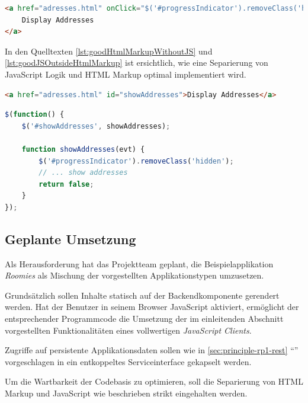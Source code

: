 \begin{lstlisting}[language=HTML, caption={Beispiel einer Vermischung von HTML Markup und JavaScript}, label={lst:badHtmlMarkupWithJavaScript}]
<a href="adresses.html" onClick="$('#progressIndicator').removeClass('hidden');showAddresses();return false;">
	Display Addresses
</a>
\end{lstlisting}

In den Quelltexten \ref{lst:goodHtmlMarkupWithoutJS} und \ref{lst:goodJSOutsideHtmlMarkup} ist ersichtlich, wie eine Separierung von JavaScript Logik und HTML Markup optimal implementiert wird.

\begin{lstlisting}[language=HTML, caption={Beispiel eines sauberen HTML Markups ohne JavaScript}, label={lst:goodHtmlMarkupWithoutJS}]
<a href="adresses.html" id="showAddresses">Display Addresses</a>
\end{lstlisting}

\begin{lstlisting}[language=JavaScript, caption={Beispiel Event-Handler in ausgelagerter JavaScript Datei}, label={lst:goodJSOutsideHtmlMarkup}]
$(function() {
	$('#showAddresses', showAddresses);

	function showAddresses(evt) {
		$('#progressIndicator').removeClass('hidden');
		// ... show addresses
		return false;
	}
});
\end{lstlisting}


\subsection*{Geplante Umsetzung}

Als Herausforderung hat das Projektteam geplant, die Beispielapplikation \emph{Roomies} als Mischung der vorgestellten Applikationstypen umzusetzen.

Grundsätzlich sollen Inhalte statisch auf der Backendkomponente gerendert werden. Hat der Benutzer in seinem Browser JavaScript aktiviert, ermöglicht der entsprechender Programmcode die Umsetzung der im einleitenden Abschnitt vorgestellten Funktionalitäten eines vollwertigen \emph{JavaScript Clients}.

Zugriffe auf persistente Applikationsdaten sollen wie in \ref{sec:principle-rp1-rest} ``'' vorgeschlagen in ein entkoppeltes Serviceinterface gekapselt werden.

Um die Wartbarkeit der Codebasis zu optimieren, soll die Separierung von HTML Markup und JavaScript wie beschrieben strikt eingehalten werden.


